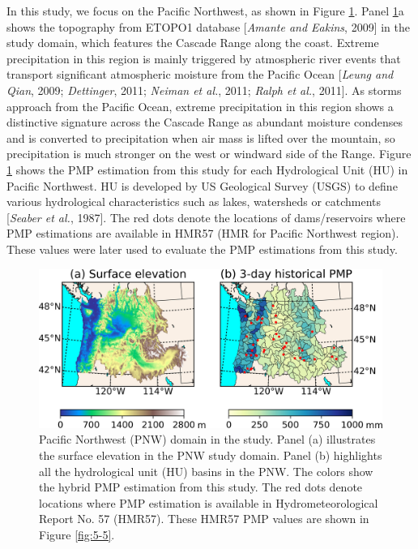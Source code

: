In this study, we focus on the Pacific Northwest, as shown in Figure \ref{fig:5-1}. Panel \ref{fig:5-1}a shows the topography from ETOPO1 database [\textit{Amante and Eakins}, 2009] in the study domain, which features the Cascade Range along the coast. Extreme precipitation in this region is mainly triggered by atmospheric river events that transport significant atmospheric moisture from the Pacific Ocean [\textit{Leung and Qian}, 2009; \textit{Dettinger}, 2011; \textit{Neiman et al.}, 2011; \textit{Ralph et al.}, 2011]. As storms approach from the Pacific Ocean, extreme precipitation in this region shows a distinctive signature across the Cascade Range as abundant moisture condenses and is converted to precipitation when air mass is lifted over the mountain, so precipitation is much stronger on the west or windward side of the Range. Figure \ref{fig:5-1} shows the PMP estimation from this study for each Hydrological Unit (HU) in Pacific Northwest. HU is developed by US Geological Survey (USGS) to define various hydrological characteristics such as lakes, watersheds or catchments [\textit{Seaber et al.}, 1987]. The red dots denote the locations of dams/reservoirs where PMP estimations are available in HMR57 (HMR for Pacific Northwest region). These values were later used to evaluate the PMP estimations from this study.

\begin{figure}[htbp]
	\includegraphics[width=\linewidth]{pics/ch5/fig1.jpg}
	\caption{Pacific Northwest (PNW) domain in the study. Panel (a) illustrates the surface elevation in the PNW study domain. Panel (b) highlights all the hydrological unit (HU) basins in the PNW. The colors show the hybrid PMP estimation from this study. The red dots denote locations where PMP estimation is available in Hydrometeorological Report No. 57 (HMR57). These HMR57 PMP values are shown in Figure \ref{fig:5-5}.}
	\label{fig:5-1}
\end{figure}

